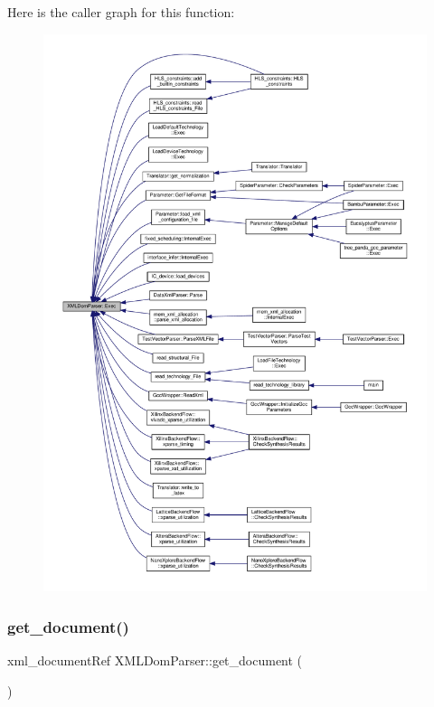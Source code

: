 Here is the caller graph for this function\+:
\nopagebreak
\begin{figure}[H]
\begin{center}
\leavevmode
\includegraphics[width=350pt]{d5/d7c/classXMLDomParser_a14355c872e4ffab4ab7e5d94a56c9d4e_icgraph}
\end{center}
\end{figure}
\mbox{\label{classXMLDomParser_a5099f463420bb3831a7fd13e004a3afb}} 
\subsubsection{\texorpdfstring{get\+\_\+document()}{get\_document()}\hspace{0.1cm}{\footnotesize\ttfamily [1/2]}}
{\footnotesize\ttfamily xml\+\_\+document\+Ref X\+M\+L\+Dom\+Parser\+::get\+\_\+document (\begin{DoxyParamCaption}{ }\end{DoxyParamCaption})}



